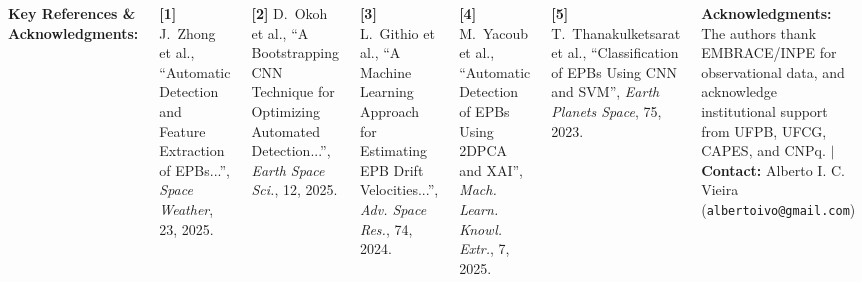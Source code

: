 \documentclass[25pt, a0paper, portrait]{tikzposter}
\begin{document}
\begin{columns}
{        \vspace{0.6em}
        {\color{NavyPrimary}\hrule height 1.5pt}
        \vspace{0.5em}

        {\bfseries\fontsize{15}{18}\selectfont\color{NavyPrimary} Key References \& Acknowledgments:}\par\vspace{4pt}
        {\fontsize{13.5}{17.5}\selectfont
        \noindent\textbf{[1]} J.~Zhong et al., ``Automatic Detection and Feature Extraction of EPBs...'', \textit{Space Weather}, 23, 2025.\par\vspace{3pt}
        \noindent\textbf{[2]} D.~Okoh et al., ``A Bootstrapping CNN Technique for Optimizing Automated Detection...'', \textit{Earth Space Sci.}, 12, 2025.\par\vspace{3pt}
        \noindent\textbf{[3]} L.~Githio et al., ``A Machine Learning Approach for Estimating EPB Drift Velocities...'', \textit{Adv. Space Res.}, 74, 2024.\par\vspace{3pt}
        \noindent\textbf{[4]} M.~Yacoub et al., ``Automatic Detection of EPBs Using 2DPCA and XAI'', \textit{Mach. Learn. Knowl. Extr.}, 7, 2025.\par\vspace{3pt}
        \noindent\textbf{[5]} T.~Thanakulketsarat et al., ``Classification of EPBs Using CNN and SVM'', \textit{Earth Planets Space}, 75, 2023.\par
        }
        
        \vspace{0.6em}
        {\fontsize{12.5}{15.5}\selectfont\color{TextMuted}
        \textbf{Acknowledgments:} The authors thank EMBRACE/INPE for observational data, and acknowledge institutional support from UFPB, UFCG, CAPES, and CNPq.
        \quad $\vert$ \quad \textbf{Contact:} Alberto I. C. Vieira (\texttt{albertoivo@gmail.com})
        }
    }

\end{columns}
\end{document}
